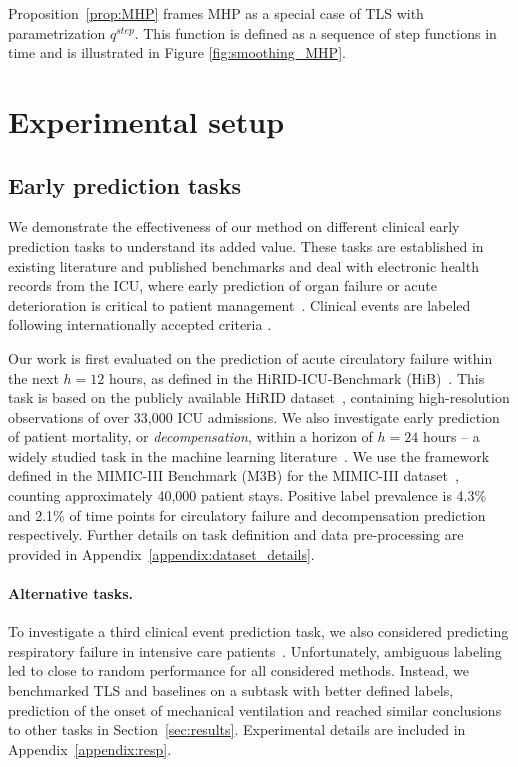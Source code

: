 \documentclass[nohyperref]{article}
\begin{document}
Proposition~\ref{prop:MHP} frames MHP as a special case of TLS with parametrization $q^{step}$. This function is defined as a sequence of step functions in time and is illustrated in Figure \ref{fig:smoothing_MHP}. 


\section{Experimental setup}\label{sec:exp_setup}
\subsection{Early prediction tasks} \label{sec:tasks}

We demonstrate the effectiveness of our method on different clinical early prediction tasks to understand its added value. These tasks are established in existing literature and published benchmarks and deal with electronic health records from the ICU, where early prediction of organ failure or acute deterioration is critical to patient management~\citep{sutton2020}. Clinical events are labeled following internationally accepted criteria \citep{harutyunyan2019multitask, yeche2021}. 

Our work is first evaluated on the prediction of acute circulatory failure within the next $h=12$ hours, as defined in the HiRID-ICU-Benchmark (HiB)~\citep{yeche2021}. This task is based on the publicly available HiRID dataset~\citep{hyland2020}, containing high-resolution observations of over 33,000 ICU admissions. We also investigate early prediction of patient mortality, or \textit{decompensation}, within a horizon of $h=24$ hours -- a widely studied task in the machine learning literature~\citep{bellamy2020evaluating}. We use the framework defined in the MIMIC-III Benchmark (M3B) \citep{harutyunyan2019multitask} for the MIMIC-III dataset~\citep{johnson2016}, counting approximately 40,000 patient stays. Positive label prevalence is 4.3\% and 2.1\% of time points for circulatory failure and decompensation prediction respectively. Further details on task definition and data pre-processing are provided in Appendix~\ref{appendix:dataset_details}.

\paragraph{Alternative tasks.} To investigate a third clinical event prediction task, we also considered predicting respiratory failure in intensive care patients~\citep{yeche2021}. Unfortunately, ambiguous labeling led to close to random performance for all considered methods. Instead, we benchmarked TLS and baselines on a subtask with better defined labels, prediction of the onset of mechanical ventilation and reached similar conclusions to other tasks in Section~\ref{sec:results}. Experimental details are included in Appendix~\ref{appendix:resp}.
\end{document}
